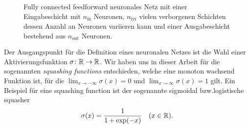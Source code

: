 \begin{center}
\begin{figure}
        \caption{Fully connected feedforward neuronales Netz mit einer Eingabeschicht mit $n_{\mathrm{in}}$ Neuronen, $n_{\mathrm{lyr}}$ vielen verborgenen Schichten dessen Anzahl an Neuronen variieren kann und einer Ausgabeschicht bestehend aus $n_{\mathrm{out}}$ Neuronen.}
        \label{fig:DNN}
    \end{figure}
\end{center}
Der Ausgangspunkt für die Definition eines neuronalen Netzes ist die Wahl einer Aktivierungsfunktion $\sigma\colon \mathbb{R} \to \mathbb{R}$. Wir haben uns in dieser Arbeit für die sogenannten \textit{squashing functions} entschieden, welche eine monoton wachsend Funktion ist, für die $\lim_{x \to -\infty}\sigma(x) = 0$ und $\lim_{x \to \infty}\sigma(x) = 1$ gilt. Ein Beispiel für eine squashing function ist der sogenannte sigmoidal bzw.\@ logistische squasher
\begin{align}
\label{logsquasher}
\sigma(x) = \frac{1}{1 + \exp(-x)} \quad (x \in \mathbb{R}).
\end{align}

